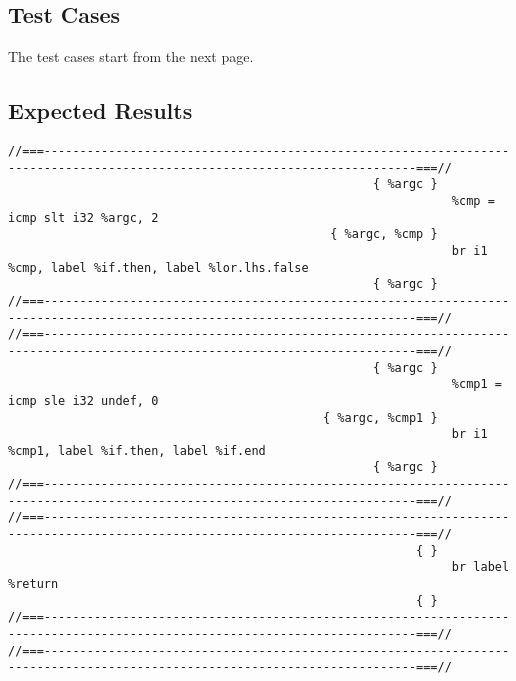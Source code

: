 \subsection{Test Cases}

The test cases start from the next page.



\subsection{Expected Results}

\begingroup
    \fontsize{6pt}{8pt}\selectfont
\begin{verbatim}
//===--------------------------------------------------------------------------------------------------------------------------===//
                                                   { %argc }
                                                              %cmp = icmp slt i32 %argc, 2
                                             { %argc, %cmp }
                                                              br i1 %cmp, label %if.then, label %lor.lhs.false
                                                   { %argc }
//===--------------------------------------------------------------------------------------------------------------------------===//
//===--------------------------------------------------------------------------------------------------------------------------===//
                                                   { %argc }
                                                              %cmp1 = icmp sle i32 undef, 0
                                            { %argc, %cmp1 }
                                                              br i1 %cmp1, label %if.then, label %if.end
                                                   { %argc }
//===--------------------------------------------------------------------------------------------------------------------------===//
//===--------------------------------------------------------------------------------------------------------------------------===//
                                                         { }
                                                              br label %return
                                                         { }
//===--------------------------------------------------------------------------------------------------------------------------===//
//===--------------------------------------------------------------------------------------------------------------------------===//

\end{verbatim}
